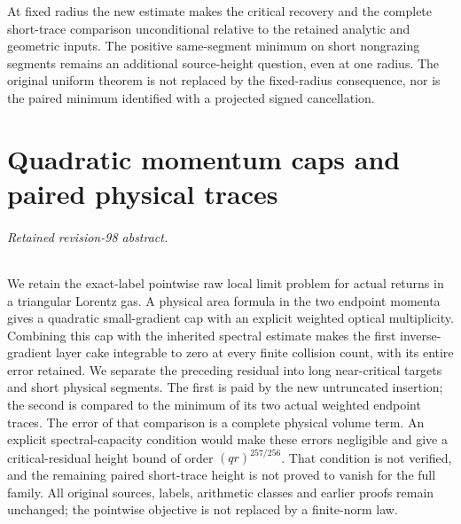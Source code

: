 \documentclass[11pt,reqno]{amsart}
\numberwithin{equation}{section}
\theoremstyle{definition}\newtheorem{definition}[theorem]{Definition}
\theoremstyle{remark}\newtheorem{remark}[theorem]{Remark}
\theoremstyle{definition}\newtheorem{inputstatement}[theorem]{Input statement}
\begin{document}
At fixed radius the new estimate makes the critical recovery and the
complete short-trace comparison unconditional relative to the retained
analytic and geometric inputs. The positive same-segment minimum on
short nongrazing segments remains an additional source-height question,
even at one radius. The original uniform theorem is not replaced by
the fixed-radius consequence, nor is the paired minimum identified
with a projected signed cancellation.











\appendix


\endgroup
\part{Quadratic momentum caps and paired physical traces}
\begingroup
\let\ArchiveLabel\label
\let\ArchiveRef\ref
\renewcommand{\label}[1]{\ArchiveLabel{v98archive:#1}}
\renewcommand{\ref}[1]{%
  \IfBeginWith{#1}{supp-}{%
    \StrBehind{#1}{supp-}[\ArchiveTarget]%
    \ArchiveRef{\ArchiveTarget}%
  }{\ArchiveRef{v98archive:#1}}%
}
\makeatletter
\let\ltx@label\label
\makeatother
\paragraph{Retained revision-98 abstract.}

We retain the exact-label pointwise raw local limit problem for actual
returns in a triangular Lorentz gas. A physical area formula in the two
endpoint momenta gives a quadratic small-gradient cap with an explicit
weighted optical multiplicity. Combining this cap with the inherited
spectral estimate makes the first inverse-gradient layer cake integrable
to zero at every finite collision count, with its entire error retained.
We separate the preceding residual into long near-critical targets and
short physical segments. The first is paid by the new untruncated
insertion; the second is compared to the minimum of its two actual
weighted endpoint traces. The error of that comparison is a complete
physical volume term. An explicit spectral-capacity condition would
make these errors negligible and give a critical-residual height bound
of order $(qr)^{257/256}$. That condition is not verified, and the remaining paired short-trace
height is not proved to vanish for the full family. All
original sources, labels, arithmetic classes and earlier proofs remain
unchanged; the pointwise objective is not replaced by a finite-norm law.
\end{document}
